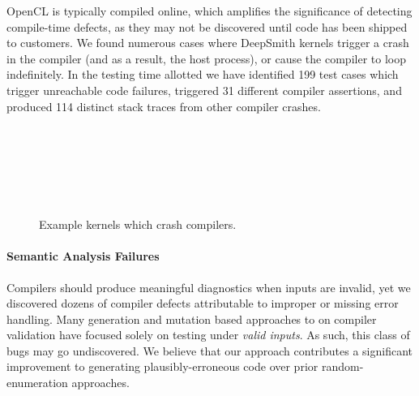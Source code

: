 OpenCL is typically compiled online, which amplifies the significance of detecting compile-time defects, as they may not be discovered until code has been shipped to customers. We found numerous cases where DeepSmith kernels trigger a crash in the compiler (and as a result, the host process), or cause the compiler to loop indefinitely. In the testing time allotted we have identified 199 test cases which trigger unreachable code failures, triggered 31 different compiler assertions, and produced 114 distinct stack traces from other compiler crashes.

\begin{figure}
  \centering %
  \\%
  \\%
  \\%
  \\%
  \\%
  \caption{Example kernels which crash compilers.}%
\end{figure}

\paragraph{Semantic Analysis Failures} %
Compilers should produce meaningful diagnostics when inputs are invalid, yet we discovered dozens of compiler defects attributable to improper or missing error handling. Many generation and mutation based approaches to on compiler validation have focused solely on testing under \emph{valid inputs}. As such, this class of bugs may go undiscovered. We believe that our approach contributes a significant improvement to generating plausibly-erroneous code over prior random-enumeration approaches.


